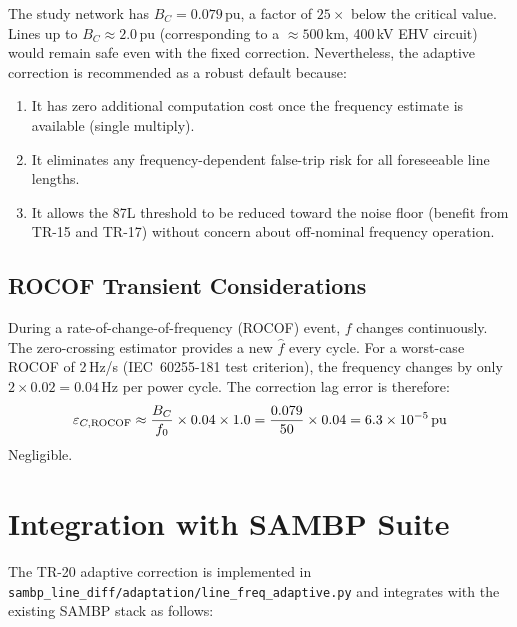 \documentclass[11pt, a4paper]{article}
\begin{document}
The study network has $B_C = 0.079$\,pu, a factor of $25\times$ below the
critical value.  Lines up to $B_C \approx 2.0$\,pu (corresponding to a
$\approx 500$\,km, 400\,kV EHV circuit) would remain safe even with the
fixed correction.  Nevertheless, the adaptive correction is recommended
as a robust default because:
\begin{enumerate}
  \item It has zero additional computation cost once the frequency estimate
        is available (single multiply).
  \item It eliminates any frequency-dependent false-trip risk for all
        foreseeable line lengths.
  \item It allows the 87L threshold to be reduced toward the noise floor
        (benefit from TR-15 and TR-17) without concern about off-nominal
        frequency operation.
\end{enumerate}

\subsection{ROCOF Transient Considerations}

During a rate-of-change-of-frequency (ROCOF) event, $f$ changes continuously.
The zero-crossing estimator provides a new $\hat{f}$ every cycle.  For a
worst-case ROCOF of 2\,Hz/s (IEC~60255-181 test criterion), the frequency
changes by only $2 \times 0.02 = 0.04$\,Hz per power cycle.  The
correction lag error is therefore:
\begin{equation}
  \varepsilon_{C,\rm ROCOF} \approx \frac{B_C}{f_0} \times 0.04 \times 1.0
  = \frac{0.079}{50} \times 0.04 = 6.3\times10^{-5}\,\text{pu}
\end{equation}
Negligible.


\section{Integration with SAMBP Suite}
\label{sec:integration}

The TR-20 adaptive correction is implemented in
\texttt{sambp\_line\_diff/adaptation/line\_freq\_adaptive.py} and integrates
with the existing SAMBP stack as follows:
\end{document}
